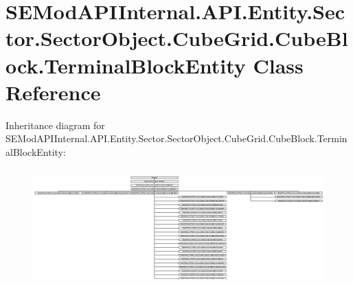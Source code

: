 \hypertarget{class_s_e_mod_a_p_i_internal_1_1_a_p_i_1_1_entity_1_1_sector_1_1_sector_object_1_1_cube_grid_1_120546f0333a2c3c0991eba1a19f6100c}{}\section{S\+E\+Mod\+A\+P\+I\+Internal.\+A\+P\+I.\+Entity.\+Sector.\+Sector\+Object.\+Cube\+Grid.\+Cube\+Block.\+Terminal\+Block\+Entity Class Reference}
\label{class_s_e_mod_a_p_i_internal_1_1_a_p_i_1_1_entity_1_1_sector_1_1_sector_object_1_1_cube_grid_1_120546f0333a2c3c0991eba1a19f6100c}
Inheritance diagram for S\+E\+Mod\+A\+P\+I\+Internal.\+A\+P\+I.\+Entity.\+Sector.\+Sector\+Object.\+Cube\+Grid.\+Cube\+Block.\+Terminal\+Block\+Entity\+:\begin{figure}[H]
\begin{center}
\leavevmode
\includegraphics[height=4.573503cm]{class_s_e_mod_a_p_i_internal_1_1_a_p_i_1_1_entity_1_1_sector_1_1_sector_object_1_1_cube_grid_1_120546f0333a2c3c0991eba1a19f6100c}
\end{center}
\end{figure}
